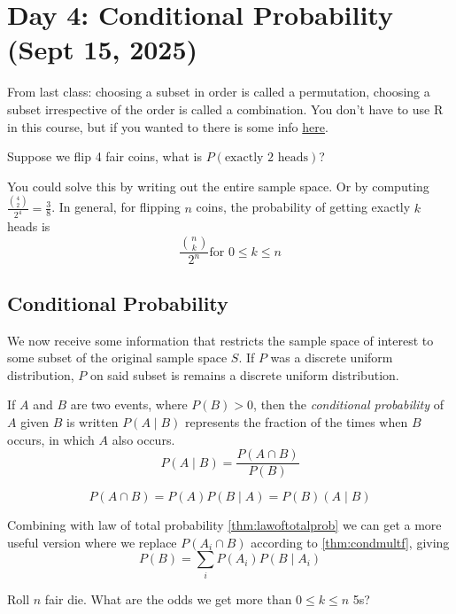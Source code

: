 \section{Day 4: Conditional Probability (Sept 15, 2025)}

From last class: choosing a subset in order is called a permutation, choosing a subset irrespective of the order is called a combination. You don't have to use R in this course, but if you wanted to there is some info \href{http://probability.ca/Rinfo.html}{here}.

\begin{problem}
    Suppose we flip 4 fair coins, what is $P(\text{exactly 2 heads})$?
\end{problem}

\noindent You could solve this by writing out the entire sample space. Or by computing $\frac{\binom{4}{2}}{2^4} = \frac{3}{8}$. In general, for flipping $n$ coins, the probability of getting exactly $k$ heads is
\[
\frac{\binom{n}{k}}{2^n} \text{for $0 \leq k \leq n$}
\]

\subsection{Conditional Probability}

We now receive some information that restricts the sample space of interest to some subset of the original sample space $S$. If $P$ was a discrete uniform distribution, $P$ on said subset is remains a discrete uniform distribution. 

\begin{definition}
    If $A$ and $B$ are two events, where $P(B) > 0$, then the \textit{conditional probability} of $A$ given $B$ is written $P(A \mid B)$  represents the fraction of the times when $B$ occurs, in which $A$ also occurs. 
\[
P(A \mid B) = \frac{P(A \cap B)}{P(B)}
\]
\end{definition}

\begin{simplethm} \label{thm:condmultf}
    \[P(A \cap B) = P(A)P(B \mid A) = P(B)(A \mid B)\]
\end{simplethm}

Combining with law of total probability \ref{thm:lawoftotalprob} we can get a more useful version where we replace $P(A_i \cap B)$ according to \ref{thm:condmultf}, giving
\[
P(B) = \sum_i P(A_i)P(B \mid A_i)
\]

\begin{problem}[Challenge]
Roll $n$ fair die. What are the odds we get more than $0 \leq k \leq n$ 5s? 
\end{problem}
